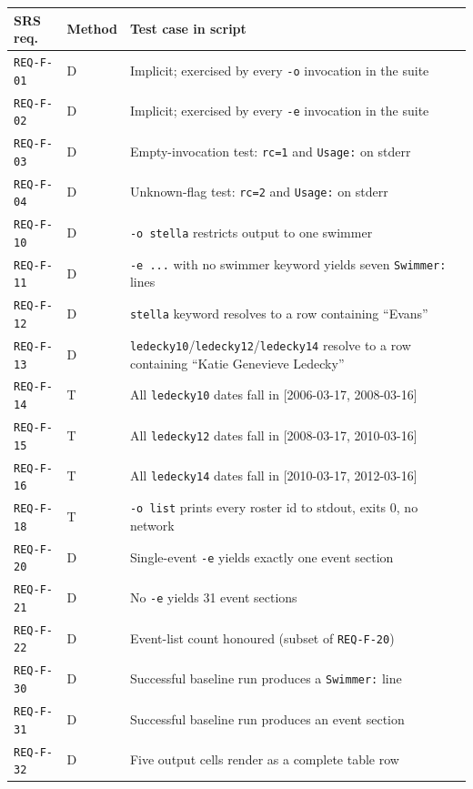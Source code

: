 \documentclass[12pt]{article}
\newcommand{\code}[1]{\texttt{#1}}
\newcommand{\req}[1]{\texttt{#1}}
\begin{document}
\begin{center}
\begin{longtable}{p{2.6cm}p{1.0cm}p{8.4cm}}
  \toprule
  \textbf{SRS req.} & \textbf{Method} & \textbf{Test case in script} \\
  \midrule\endhead
  \req{REQ-F-01}    & D & Implicit; exercised by every \code{-o} invocation in the suite \\
  \req{REQ-F-02}    & D & Implicit; exercised by every \code{-e} invocation in the suite \\
  \req{REQ-F-03}    & D & Empty-invocation test: \code{rc=1} and \code{Usage:} on stderr \\
  \req{REQ-F-04}    & D & Unknown-flag test: \code{rc=2} and \code{Usage:} on stderr  \\
  \req{REQ-F-10}    & D & \code{-o stella} restricts output to one swimmer            \\
  \req{REQ-F-11}    & D & \code{-e ...} with no swimmer keyword yields seven \code{Swimmer:} lines \\
  \req{REQ-F-12}    & D & \code{stella} keyword resolves to a row containing ``Evans'' \\
  \req{REQ-F-13}    & D & \code{ledecky10}/\code{ledecky12}/\code{ledecky14} resolve to a row containing ``Katie Genevieve Ledecky'' \\
  \req{REQ-F-14}    & T & All \code{ledecky10} dates fall in [2006-03-17, 2008-03-16]  \\
  \req{REQ-F-15}    & T & All \code{ledecky12} dates fall in [2008-03-17, 2010-03-16]  \\
  \req{REQ-F-16}    & T & All \code{ledecky14} dates fall in [2010-03-17, 2012-03-16]  \\
  \req{REQ-F-18}    & T & \code{-o list} prints every roster id to stdout, exits 0, no network \\
  \req{REQ-F-20}    & D & Single-event \code{-e} yields exactly one event section    \\
  \req{REQ-F-21}    & D & No \code{-e} yields 31 event sections                      \\
  \req{REQ-F-22}    & D & Event-list count honoured (subset of \req{REQ-F-20})        \\
  \req{REQ-F-30}    & D & Successful baseline run produces a \code{Swimmer:} line     \\
  \req{REQ-F-31}    & D & Successful baseline run produces an event section          \\
  \req{REQ-F-32}    & D & Five output cells render as a complete table row           \\

\end{longtable}
\end{center}
\end{document}
